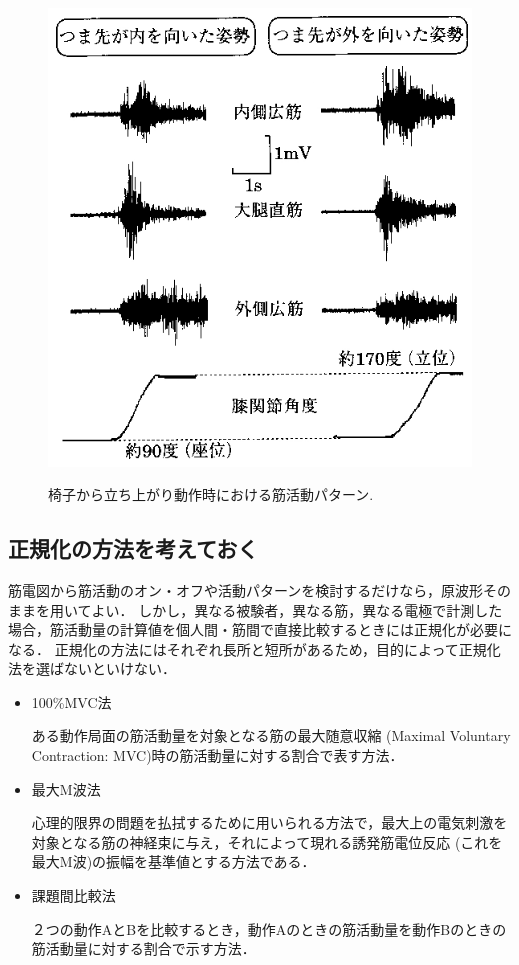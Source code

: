 \documentclass[10pt,twocolumn]{jarticle}
\begin{document}
\begin{figure}
\begin{center}
{
   \scalebox{0.8}
   {
      \includegraphics{emg003.eps}
   }
}
\caption{椅子から立ち上がり動作時における筋活動パターン.}
\label{fig:fig1}
\end{center}
\end{figure}

\subsection{正規化の方法を考えておく}

筋電図から筋活動のオン・オフや活動パターンを検討するだけなら，原波形そのままを用いてよい．
しかし，異なる被験者，異なる筋，異なる電極で計測した場合，筋活動量の計算値を個人間・筋間で直接比較するときには正規化が必要になる．
正規化の方法にはそれぞれ長所と短所があるため，目的によって正規化法を選ばないといけない．

\begin{itemize}
\item 100\%MVC法

ある動作局面の筋活動量を対象となる筋の最大随意収縮 (Maximal Voluntary Contraction: MVC)時の筋活動量に対する割合で表す方法．

\item 最大M波法

心理的限界の問題を払拭するために用いられる方法で，最大上の電気刺激を対象となる筋の神経束に与え，それによって現れる誘発筋電位反応 (これを最大M波)の振幅を基準値とする方法である．

\item 課題間比較法

２つの動作AとBを比較するとき，動作Aのときの筋活動量を動作Bのときの筋活動量に対する割合で示す方法．
\end{itemize}
\end{document}
